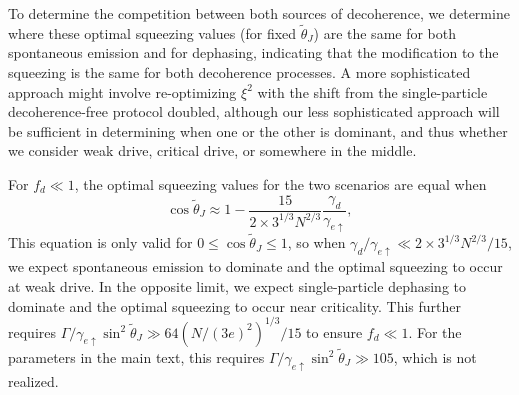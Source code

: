 \documentclass[11pt]{article}
\begin{document}
To determine the competition between both sources of decoherence, we determine where these optimal squeezing values (for fixed $\tilde{\theta}_J$) are the same for both spontaneous emission and for dephasing, indicating that the modification to the squeezing is the same for both decoherence processes. A more sophisticated approach might involve re-optimizing $\xi^2$ with the shift from the single-particle decoherence-free protocol doubled, although our less sophisticated approach will be sufficient in determining when one or the other is dominant, and thus whether we consider weak drive, critical drive, or somewhere in the middle.

For $f_d \ll 1$, the optimal squeezing values for the two scenarios are equal when
\begin{equation}
     \cos \tilde{\theta}_J \approx 1- \frac{15 }{2 \times 3^{1/3}  N^{2/3}} \frac{\gamma_d}{\gamma_{e \uparrow}},
\end{equation}
This equation is only valid for $0 \leq \cos \tilde{\theta}_J \leq 1$, so when $\gamma_d/\gamma_{e \uparrow} \ll 2 \times 3^{1/3} N^{2/3}/15$, we expect spontaneous emission to dominate and the optimal squeezing to occur at weak drive. In the opposite limit, we expect single-particle dephasing to dominate and the optimal squeezing to occur near criticality. This further requires $ \Gamma/\gamma_{e \uparrow} \sin^2 \tilde{\theta}_J \gg 64 (N/(3e)^2)^{1/3}/15$ to ensure $f_d \ll 1$. For the parameters in the main text, this requires $\Gamma/\gamma_{e \uparrow} \sin^2 \tilde{\theta}_J \gg 105$, which is not realized. 
\end{document}
